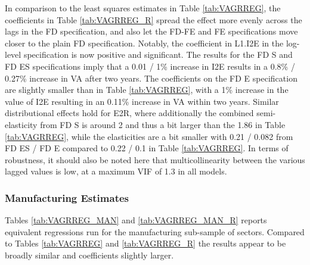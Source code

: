 \documentclass[a4paper]{article}
\begin{document}
In comparison to the least squares estimates in Table \ref{tab:VAGRREG}, the coefficients in Table \ref{tab:VAGRREG_R} spread the effect more evenly across the lags in the FD specification, and also let the FD-FE and FE specifications move closer to the plain FD specification. Notably, the coefficient in L1.I2E in the log-level specification is now positive and significant. The results for the FD S and FD ES specifications imply that a 0.01 / 1\% increase in I2E results in a 0.8\% / 0.27\% increase in VA after two years. The coefficients on the FD E specification are slightly smaller than in Table  \ref{tab:VAGRREG}, with a 1\% increase in the value of I2E resulting in an 0.11\% increase in VA within two years. Similar distributional effects hold for E2R, where additionally the combined semi-elasticity from FD S is around 2 and thus a bit larger than the 1.86 in Table \ref{tab:VAGRREG}, while the elasticities are a bit smaller with 0.21 / 0.082 from FD ES / FD E compared to 0.22 / 0.1 in Table \ref{tab:VAGRREG}. In terms of robustness, it should also be noted here that multicollinearity between the various lagged values is low, at a maximum VIF of 1.3 in all models. 

\subsubsection{Manufacturing Estimates}

Tables \ref{tab:VAGRREG_MAN} and \ref{tab:VAGRREG_MAN_R} reports equivalent regressions run for the manufacturing sub-sample of sectors. Compared to Tables \ref{tab:VAGRREG} and \ref{tab:VAGRREG_R} the results appear to be broadly similar and coefficients slightly larger. 
\end{document}
